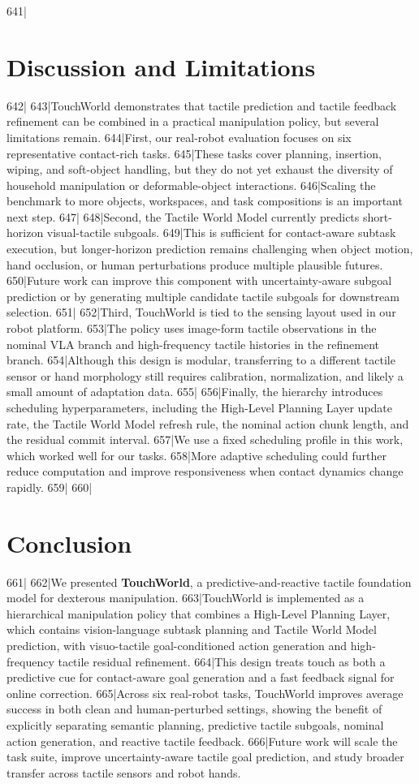 641|\section{Discussion and Limitations}
642|
643|TouchWorld demonstrates that tactile prediction and tactile feedback refinement can be combined in a practical manipulation policy, but several limitations remain.
644|First, our real-robot evaluation focuses on six representative contact-rich tasks.
645|These tasks cover planning, insertion, wiping, and soft-object handling, but they do not yet exhaust the diversity of household manipulation or deformable-object interactions.
646|Scaling the benchmark to more objects, workspaces, and task compositions is an important next step.
647|
648|Second, the Tactile World Model currently predicts short-horizon visual-tactile subgoals.
649|This is sufficient for contact-aware subtask execution, but longer-horizon prediction remains challenging when object motion, hand occlusion, or human perturbations produce multiple plausible futures.
650|Future work can improve this component with uncertainty-aware subgoal prediction or by generating multiple candidate tactile subgoals for downstream selection.
651|
652|Third, TouchWorld is tied to the sensing layout used in our robot platform.
653|The policy uses image-form tactile observations in the nominal VLA branch and high-frequency tactile histories in the refinement branch.
654|Although this design is modular, transferring to a different tactile sensor or hand morphology still requires calibration, normalization, and likely a small amount of adaptation data.
655|
656|Finally, the hierarchy introduces scheduling hyperparameters, including the High-Level Planning Layer update rate, the Tactile World Model refresh rule, the nominal action chunk length, and the residual commit interval.
657|We use a fixed scheduling profile in this work, which worked well for our tasks.
658|More adaptive scheduling could further reduce computation and improve responsiveness when contact dynamics change rapidly.
659|
660|\section{Conclusion}
661|
662|We presented \textbf{TouchWorld}, a predictive-and-reactive tactile foundation model for dexterous manipulation.
663|TouchWorld is implemented as a hierarchical manipulation policy that combines a High-Level Planning Layer, which contains vision-language subtask planning and Tactile World Model prediction, with visuo-tactile goal-conditioned action generation and high-frequency tactile residual refinement.
664|This design treats touch as both a predictive cue for contact-aware goal generation and a fast feedback signal for online correction.
665|Across six real-robot tasks, TouchWorld improves average success in both clean and human-perturbed settings, showing the benefit of explicitly separating semantic planning, predictive tactile subgoals, nominal action generation, and reactive tactile feedback.
666|Future work will scale the task suite, improve uncertainty-aware tactile goal prediction, and study broader transfer across tactile sensors and robot hands.
